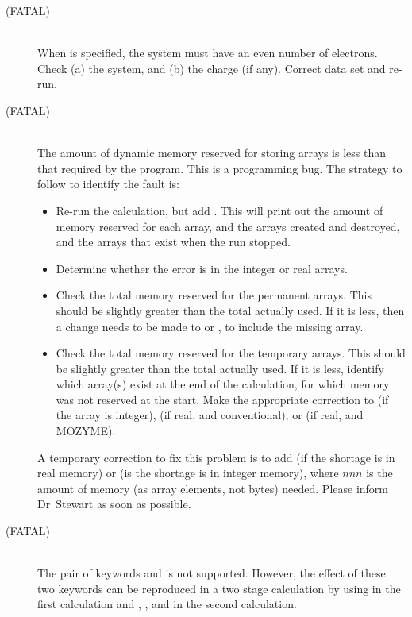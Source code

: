 \begin{description}
\item[ (FATAL)]~\\
When  is specified, the system must have an even number of  
electrons.  Check (a) the system, and (b) the charge (if any).  Correct 
data set and re-run. 
 
\item[ (FATAL)]~\\
The amount of dynamic memory reserved for storing arrays is less than that
required by the program.  This is a programming bug.  The strategy to follow
to identify the fault is:
\begin{itemize}
\item Re-run the calculation, but add .  This will print out the
amount of memory reserved for each array, and the arrays created and destroyed,
and the arrays that exist when the run stopped.
\item Determine whether the error is in the integer or real arrays.
\item  Check the total memory reserved for the permanent arrays.  This should
be slightly greater than the total actually used.  If it is less, then a change
needs to be made to  or , to include the missing 
array.
\item Check the total memory reserved for the temporary arrays.  This should be
slightly greater than the total actually used.  If it is less, identify which
array(s) exist at the end of the calculation, for which memory was not reserved
at the start.  Make the appropriate correction to  (if the array 
is integer),  (if real, and conventional), or  (if
real, and MOZYME).
\end{itemize}
A temporary correction to fix this problem is to add  (if the 
shortage is in real memory) or   (is the shortage is in integer
memory), where $nnn$ is the amount of memory (as array elements, not bytes)
needed. Please inform Dr~Stewart as soon as possible.

\item[ (FATAL)]~\\
The pair of keywords  and  is not supported.  However, the
effect of these two keywords can be reproduced in a two stage calculation 
by using  in the first calculation and , , 
and  in the second calculation.


\end{description}
